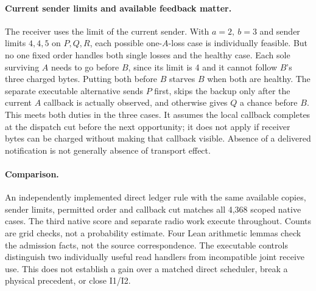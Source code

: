\documentclass[11pt]{article}
\begin{document}
\paragraph{Current sender limits and available feedback matter.}
The receiver uses the limit of the current sender. With
\(a=2,\ b=3\) and sender limits \(4,4,5\) on \(P,Q,R\),
each possible one-\(A\)-loss case is individually feasible.
But no one fixed order handles both single losses and
the healthy case. Each sole surviving \(A\) needs to go
before \(B\), since its limit is 4 and it cannot follow
\(B\)'s three charged bytes. Putting both before \(B\)
starves \(B\) when both are healthy. The separate executable
alternative sends \(P\) first, skips the backup only after
the current \(A\) callback is actually observed, and otherwise
gives \(Q\) a chance before \(B\). This meets both duties in
the three cases. It assumes the local callback completes at
the dispatch cut before the next opportunity; it does not
apply if receiver bytes can be charged without making that
callback visible. Absence of a delivered notification is not
generally absence of transport effect.

\paragraph{Comparison.}
An independently implemented direct ledger rule with the same
available copies, sender limits, permitted order and callback
cut matches all 4,368 scoped native cases. The third native
score and separate radio work execute throughout. Counts are
grid checks, not a probability estimate. Four Lean arithmetic
lemmas check the admission facts, not the source correspondence.
The executable controls distinguish two individually useful
read handlers from incompatible joint receive use. This
does not establish a gain over a matched direct scheduler,
break a physical precedent, or close I1/I2.
\end{document}
